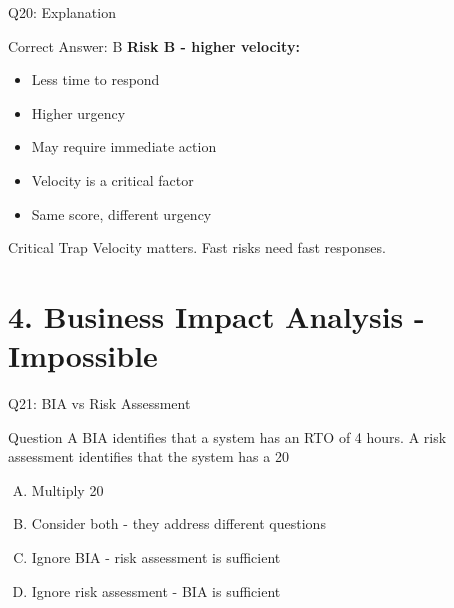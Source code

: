 \documentclass{beamer}
\begin{document}
			\begin{frame}{Q20: Explanation}
				\begin{block}{Correct Answer: B}
					\textbf{Risk B - higher velocity:}
					\begin{itemize}
						\item Less time to respond
						\item Higher urgency
						\item May require immediate action
						\item Velocity is a critical factor
						\item Same score, different urgency
					\end{itemize}
				\end{block}
				\begin{alertblock}{Critical Trap}
					Velocity matters. Fast risks need fast responses.
				\end{alertblock}
			\end{frame}
			
			
			\section{4. Business Impact Analysis - Impossible}
			
			\begin{frame}{Q21: BIA vs Risk Assessment}
				\begin{block}{Question}
					A BIA identifies that a system has an RTO of 4 hours. A risk assessment identifies that the system has a 20%
				\end{block}
				\begin{enumerate}[(A)]
					\item Multiply 20%
					\item Consider both - they address different questions
					\item Ignore BIA - risk assessment is sufficient
					\item Ignore risk assessment - BIA is sufficient
				\end{enumerate}
			\end{frame}
			
\end{document}
